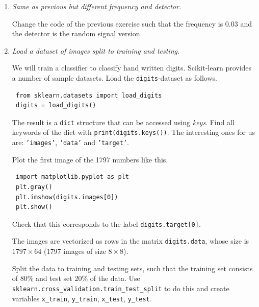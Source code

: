 \documentclass[a4paper,12pt]{scrartcl}
\newcommand{\python}{{\fbox{\texttt{\bfseries python}}\quad}}
\begin{document}
\begin{enumerate}
\begin{enumerate}
\end{enumerate}



\item \python \emph{Same as previous but different frequency and detector.}

Change the code of the previous exercise such that the frequency is 0.03 and
the detector is the random signal version.

		
\item \python \emph{Load a dataset of images split to training and testing.}
\label{ex1}

We will train a classifier to classify hand written digits.
Scikit-learn provides a number of sample datasets.
Load the \verb+digits+-dataset as follows.

\begin{lstlisting}
 from sklearn.datasets import load_digits
 digits = load_digits()
\end{lstlisting}

The result is a \verb+dict+ structure that can be accessed using
\emph{keys}. Find all keywords of the dict with \verb+print(digits.keys())+.
The interesting ones for us are: \texttt{'images'}, \texttt{'data'} and \texttt{'target'}.

Plot the first image of the 1797 numbers like this.
\begin{lstlisting}
 import matplotlib.pyplot as plt 
 plt.gray() 
 plt.imshow(digits.images[0])
 plt.show() 
\end{lstlisting}
Check that this corresponds to the label \verb+digits.target[0]+.

The images are vectorized as rows in the matrix \verb+digits.data+,
whose size is $1797\times 64$ (1797 images of size $8\times 8$).

Split the data to training and testing sets, such that the training
set consists of 80\% and test set 20\% of the data. Use
\verb+sklearn.cross_validation.train_test_split+ to do this and
create variables \verb+x_train+, \verb+y_train+, \verb+x_test+, \verb+y_test+.


\end{enumerate}
\end{document}
